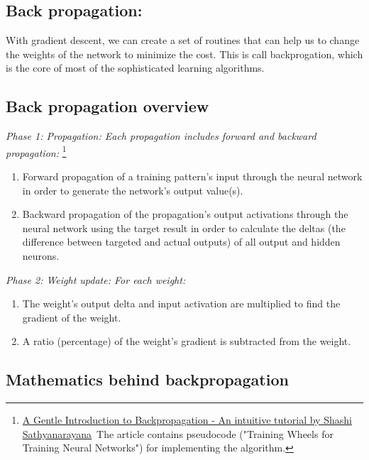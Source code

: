 \documentclass[]{article}
\begin{document}
\begin{multicols}{2}

\section{Back propagation:}

With gradient descent, we can create a set of routines that can help us
to change the weights of the network to minimize the cost. This is call backprogation, which is the core of most of the  sophisticated learning algorithms. 

\subsection{Back propagation overview}

\emph{Phase 1: Propagation: Each propagation
includes forward and backward propagation:}
\footnote{\href{http://numericinsight.com/uploads/A_Gentle_Introduction_to_Backpropagation.pdf}{A Gentle Introduction to Backpropagation - An intuitive tutorial by
Shashi Sathyanarayana}~The article contains pseudocode ("Training
Wheels for Training Neural Networks") for implementing the algorithm.}  

\begin{enumerate}
\def\labelenumi{\arabic{enumi}.}
\item
  Forward propagation of a training pattern's input through the neural
  network in order to generate the network's output value(s). 
\item
  Backward propagation of the propagation's output activations through
  the neural network using the target result in order to
  calculate the deltas (the difference between targeted and actual
  outputs) of all output and hidden neurons.
\end{enumerate}

\emph{
Phase 2: Weight update: For each weight:}

\begin{enumerate}
\def\labelenumi{\arabic{enumi}.}
\item
  The weight's output delta and input activation are multiplied to find
  the gradient of the weight.
\item
  A ratio (percentage) of the weight's gradient is subtracted from the
  weight.
\end{enumerate}

\subsection{Mathematics behind backpropagation}


\end{multicols}
\end{document}
